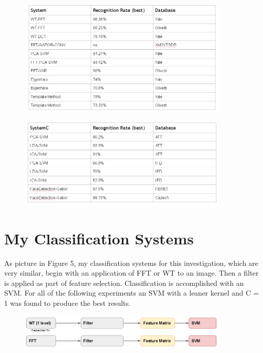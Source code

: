 \documentclass[12pt, letterpaper]{article}
\begin{document}
\begin{center}
	\begin{figure}[!htbp]
		\centering
		\includegraphics[width=10cm, keepaspectratio]{acc}
		\label{fig:acc}
	\end{figure}
\end{center}

\begin{center}
	\begin{figure}[!htbp]
		\centering
		\includegraphics[width=10cm, keepaspectratio]{acc1}
		\label{fig:acc}
	\end{figure}
\end{center}

\section{My Classification Systems}

As picture in Figure 5, my classification systems for this investigation, which are very similar, begin with an application of FFT or WT to an image. Then a filter is applied as part of feature selection. Classification is accomplished with an SVM. For all of the following experiments an SVM with a leaner kernel and C = 1 was found to produce the best results.    
 
\begin{center}
	\begin{figure}[!htbp]
		\centering
		\includegraphics[width=10cm, keepaspectratio]{mysys}
		\label{fig:acc}
	\end{figure}
\end{center}
\end{document}
